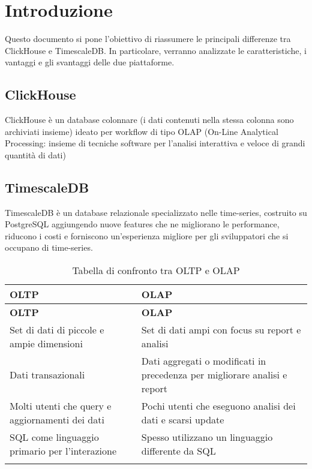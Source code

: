 \section{Introduzione}
Questo documento si pone l'obiettivo di riassumere le principali differenze tra  ClickHouse e TimescaleDB.
In particolare, verranno analizzate le caratteristiche, i vantaggi e gli svantaggi delle due piattaforme.\\

\subsection{ClickHouse}
ClickHouse è un database colonnare (i dati contenuti nella stessa colonna sono archiviati insieme) ideato per workflow di tipo OLAP (On-Line Analytical Processing: insieme di tecniche software per l'analisi interattiva e veloce di grandi quantità di dati)

\subsection{TimescaleDB}
TimescaleDB è un database relazionale specializzato nelle time-series, costruito su PostgreSQL aggiungendo nuove features che ne migliorano le performance, riducono i costi e forniscono un’esperienza migliore per gli sviluppatori che si occupano di time-series.

\begin{longtable}{|>{\raggedright\arraybackslash}m{}|>{\raggedright\arraybackslash}m{}|}
	\hline
	\textbf{OLTP} & \textbf{OLAP}\\
	\hline
	\endfirsthead
	\hline
	\textbf{OLTP} & \textbf{OLAP}\\
	\endhead
	 Set di dati di piccole e ampie dimensioni  & Set di dati ampi con focus su report e analisi\\
	\hline
	 Dati transazionali  & Dati aggregati o modificati in precedenza per migliorare analisi e report \\
	\hline
	 Molti utenti che query e aggiornamenti dei dati & Pochi utenti che eseguono analisi dei dati e scarsi update    \\
	\hline
     SQL come linguaggio primario per l'interazione & Spesso utilizzano un linguaggio differente da SQL    \\
	\hline
	\caption{Tabella di confronto tra OLTP e OLAP}
	\label{table:1}
\end{longtable}